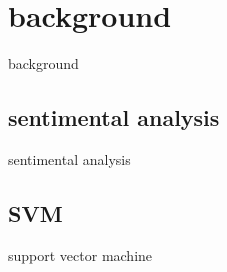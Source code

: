 \chapter{background}
background

\section{sentimental analysis} \label{RTE}
sentimental analysis
\section{SVM} \label{sec:word2vec}
support vector machine

